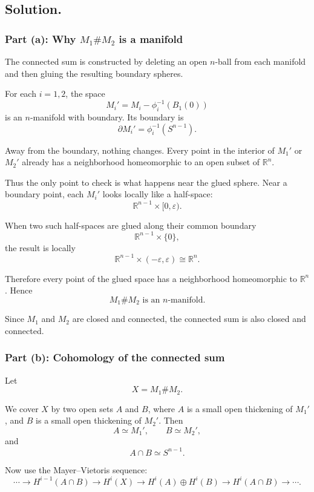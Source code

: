 \documentclass[12pt,a4paper]{article}
\theoremstyle{notespace}
\begin{document}
\subsection*{\textbf{Solution.}}

\subsubsection*{Part (a): Why \texorpdfstring{$M_1\#M_2$}{M1\#M2} is a manifold}

The connected sum is constructed by deleting an open \(n\)-ball from each
manifold and then gluing the resulting boundary spheres.

For each \(i=1,2\), the space
\[
M_i'
=
M_i-\phi_i^{-1}(B_1(0))
\]
is an \(n\)-manifold with boundary. Its boundary is
\[
\partial M_i'
=
\phi_i^{-1}(S^{n-1}).
\]

Away from the boundary, nothing changes. Every point in the interior of
\(M_1'\) or \(M_2'\) already has a neighborhood homeomorphic to an open
subset of \(\mathbb{R}^n\).

Thus the only point to check is what happens near the glued sphere. Near a
boundary point, each \(M_i'\) looks locally like a half-space:
\[
\mathbb{R}^{n-1}\times [0,\varepsilon).
\]

When two such half-spaces are glued along their common boundary
\[
\mathbb{R}^{n-1}\times \{0\},
\]
the result is locally
\[
\mathbb{R}^{n-1}\times (-\varepsilon,\varepsilon)
\cong
\mathbb{R}^n.
\]

Therefore every point of the glued space has a neighborhood homeomorphic to
\(\mathbb{R}^n\). Hence
\[
\boxed{M_1\#M_2\text{ is an }n\text{-manifold}.}
\]

Since \(M_1\) and \(M_2\) are closed and connected, the connected sum is also
closed and connected.

\subsubsection*{Part (b): Cohomology of the connected sum}

Let
\[
X=M_1\#M_2.
\]

We cover \(X\) by two open sets \(A\) and \(B\), where \(A\) is a small open
thickening of \(M_1'\), and \(B\) is a small open thickening of \(M_2'\).
Then
\[
A\simeq M_1',
\qquad
B\simeq M_2',
\]
and
\[
A\cap B\simeq S^{n-1}.
\]

Now use the Mayer--Vietoris sequence:
\[
\cdots
\longrightarrow
H^{i-1}(A\cap B)
\longrightarrow
H^i(X)
\longrightarrow
H^i(A)\oplus H^i(B)
\longrightarrow
H^i(A\cap B)
\longrightarrow
\cdots .
\]
\end{document}
